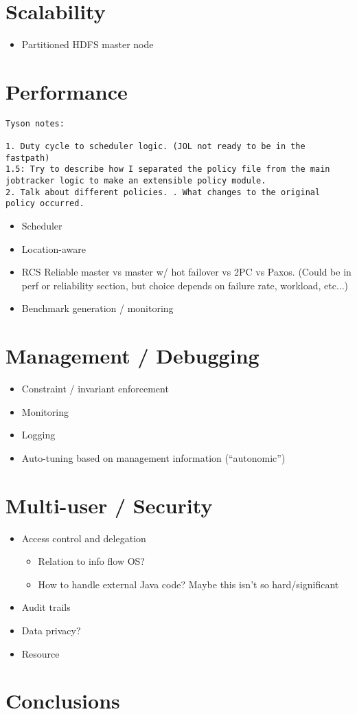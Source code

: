 \documentclass{sig-alternate}
\begin{document}
\section{Scalability}
\begin{itemize}
\item
  Partitioned HDFS master node
\end{itemize}

\section{Performance}

\begin{verbatim}
Tyson notes:

1. Duty cycle to scheduler logic. (JOL not ready to be in the fastpath)
1.5: Try to describe how I separated the policy file from the main jobtracker logic to make an extensible policy module.
2. Talk about different policies. . What changes to the original policy occurred. 

\end{verbatim}

\begin{itemize}
\item
  Scheduler
\item
  Location-aware
\item
  RCS Reliable master vs master w/ hot failover vs 2PC vs Paxos.  (Could be in perf or reliability section, but choice depends on failure rate, workload, etc...)
\item
  Benchmark generation / monitoring
\end{itemize}

\section{Management / Debugging}
\begin{itemize}
\item
  Constraint / invariant enforcement
\item
  Monitoring
\item
  Logging
\item
  Auto-tuning based on management information (``autonomic'')
\end{itemize}

\section{Multi-user / Security}
\begin{itemize}
\item
  Access control and delegation
  \begin{itemize}
  \item
    Relation to info flow OS?
  \item
    How to handle external Java code? Maybe this isn't so hard/significant
  \end{itemize}
\item
  Audit trails
\item
  Data privacy?
\item
  Resource
\end{itemize}
\section{Conclusions}



\end{document}
